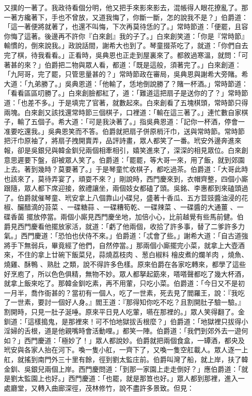 \begin{showcontents}{}
又撲的一著了。我政待看個分明，他又把手來影來影去，混帳得人眼花撩亂了。那一著方纔著下，手也不曾放，又道我悔了，你斷一斷，怎的說我不是？」伯爵道：「這一著便將就著了，也還不叫悔，下次再莫待恁的了。」常時節道：「便罷，且容你悔了這著。後邊再不許你『白來創』我的子了。」白來創笑道：「你是『常時節』輸慣的，倒來說我。」政說話間，謝希大也到了。琴童掇茶吃了，就道：「你們自去完了棋，待我看看。」正看時，吳典恩也正走到屋裏來了。都敘過寒溫，就問：「可著甚的來？」伯爵把二物與眾人看，都道：「既是這般，須著完了。」白來創道：「九阿哥，完了罷，只管思量甚的？」常時節政在審局，吳典恩與謝希大旁賭。希大道：「九弟勝了。」吳典恩道：「他輸了，恁地倒說勝了？賭一杯酒。」常時節道：「看看區區叨勝了。」白來創臉都紅了，道：「難道這把扇子是送你的了？」常時節道：「也差不多。」于是填完了官著，就數起來。白來創看了五塊棋頭，常時節只得兩塊。白來創又該找還常時節三個棋子，口裡道：「輸在這三著了。」連忙數自家棋子，輸了五個子。希大道：「可是我決著了。」指吳典恩道：「記你一杯酒，停會一准要吃還我。」吳典恩笑而不答。伯爵就把扇子併原梢汗巾，送與常時節。常時節把汗巾原袖了，將扇子拽開賣弄，品評詩畫，眾人都笑了一番。玳安外邊奔進來報，卻是吳銀兒與韓金釧兒兩個相牽相引，嬉笑進來了，深深的相見眾位。白來創意思遲要下盤，卻被眾人笑了。伯爵道：「罷罷，等大哥一來，用了飯，就到郊園上去。著到幾時？莫要著了。」于是琴童忙收棋子，都吃過茶。伯爵道：「大哥此時也該來了，莫待弄宴了，頑耍不來？」剛說時，西門慶來到，衣帽齊整，四個小廝跟隨，眾人都下席迎接，敘禮讓坐，兩個妓女都磕了頭。吳銘、李惠都到來磕頭過了。伯爵就催琴童、玳安拿上八個靠山小碟兒，盛著十香瓜、五方荳豉醬油浸的花椒、釅醋滴的苔菜 、一碟糖蒜 、一碟糟筍乾、一碟辣菜 、一碟醬的大通薑 、一碟香菌 擺放停當。兩個小廝見西門慶坐地，加倍小心，比前越覺有些馬前健。伯爵見西門慶看他擺放家活，就道：「虧了他兩個，收拾了許多事，替了二爹許多力氣。」西門慶道：「恐怕也伏侍不來。」伯爵道：「忒會了些。」謝希大道：「自古道強將手下無弱兵，畢竟經了他們，自然停當。」那兩個小廝擺完小菜，就拿上大壺酒來，不住的拿上廿碗下飯菜兒，蒜燒荔枝肉 、葱白椒料 檜皮煮的爛羊肉 ，燒魚、燒雞、酥鴨 、熟肚 之類，說不得許多色樣。原來伯爵在各家吃轉來，都學了這些好烹庖了，所以色色俱精，無物不妙。眾人都拏起筯來，嗒嗒聲都吃了幾大杯酒，就拿上飯來吃了。那韓金釧吃素，再不用葷，只吃小菜。伯爵道：「今日又不是初一月半，喬作衙甚的？當初有一個人，吃了一世素，死去見了閻羅王，說：『我吃了一世素，要討一個好人身。』閻王道：『那得知你吃不吃？且割開肚子驗一驗。』割開時，只見一肚子涎唾。原來平日見人吃葷，嚥在那裡的。」眾人笑得翻了。金釧道：「這樣搗鬼，是那裡來！可不怕地獄拔舌根麼？」伯爵道：「地獄裡只拔得小淫婦的舌根，道是他親嘴時會活動哩。」都笑一陣。伯爵道：「我們到郊外去一遊何如？」西門慶道：「極妙了！」眾人都說妙。伯爵就把兩個食盒，一罈酒，都央及玳安與各家人抬在河下。喚一隻小舡，一齊下了，又喚一隻空舡載人。眾人逐一上舡，就搖到南門外三十里有餘，徑到劉太監庄前。伯爵叫灣了船，就上岸，扶了韓金釧、吳銀兒兩個上岸。西門慶問道：「到那一家園上走走倒好？」應伯爵道：「就是劉太監園上也好。」西門慶道：「也罷，就是那笪也好。」眾人都到那裡，進入一處廳堂，又轉入曲廊深徑，茂林修竹，說不盡許多景致。但見：


\end{showcontents}
